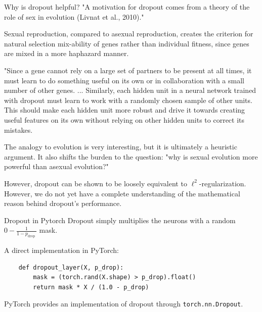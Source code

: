 \begin{frame}[allowframebreaks]

\begin{myconceptblock}{6.12}{Why is dropout helpful?}
    "A motivation for dropout comes from a theory of the role of sex in evolution (Livnat et al., 2010)."

    Sexual reproduction, compared to asexual reproduction, creates the criterion for natural selection mix-ability of genes rather than individual fitness, since genes are mixed in a more haphazard manner.

    "Since a gene cannot rely on a large set of partners to be present at all times, it must learn to do something useful on its own or in collaboration with a small number of other genes. ... Similarly, each hidden unit in a neural network trained with dropout must learn to work with a randomly chosen sample of other units. This should make each hidden unit more robust and drive it towards creating useful features on its own without relying on other hidden units to correct its mistakes.

    The analogy to evolution is very interesting, but it is ultimately a heuristic argument. It also shifts the burden to the question: "why is sexual evolution more powerful than asexual evolution?"

    However, dropout can be shown to be loosely equivalent to $\ell^{2}$-regularization. However, we do not yet have a complete understanding of the mathematical reason behind dropout's performance.
\end{myconceptblock}

\end{frame}

\begin{frame}[allowframebreaks]

\begin{myconceptblock}{6.13}{Dropout in Pytorch}
    Dropout simply multiplies the neurons with a random $0-\frac{1}{1-p_{\text {drop }}}$ mask.

    A direct implementation in PyTorch:

    \begin{verbatim}
    def dropout_layer(X, p_drop):
        mask = (torch.rand(X.shape) > p_drop).float()
        return mask * X / (1.0 - p_drop)
    \end{verbatim}

    PyTorch provides an implementation of dropout through \verb|torch.nn.Dropout|.
\end{myconceptblock}

\end{frame}

